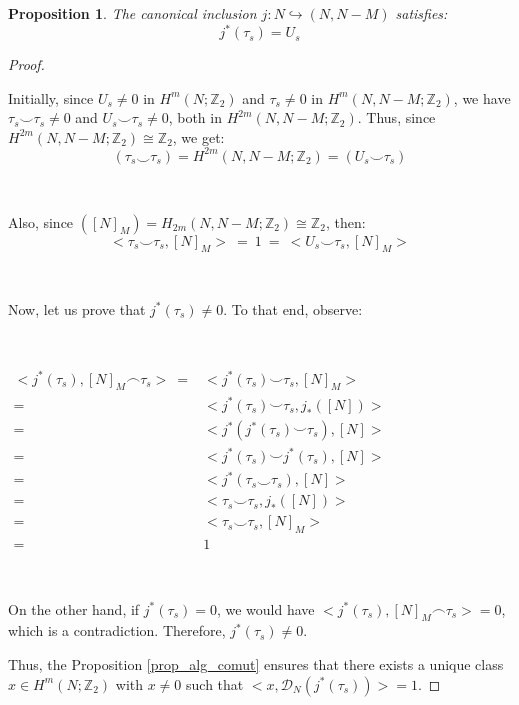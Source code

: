 \documentclass[12pt,oneside]{book}
\newtheorem{prop}   {Proposition}[chapter]
\newcommand{\Z}{\mathbb{Z}}
\newcommand{\ccup}{\smile}
\newcommand{\ccap}{\frown}
\begin{document}
    \begin{prop}\label{principal}
	    The canonical inclusion $j:N\hookrightarrow (N,N-M)$ satisfies:
	    $$ j^{*}(\tau_{s})=U_{s} $$
    \end{prop}
    \begin{proof}

        \

        Initially, since $U_{s}\neq 0$ in $H^{m}(N;\Z_{2})$ and $\tau_{s}\neq 0$ in $H^{m}(N,N-M;\Z_{2})$, we have 
        $\tau_{s}\ccup\tau_{s}\neq 0$ and $U_{s}\ccup\tau_{s}\neq 0$, both in $H^{2m}(N,N-M;\Z_{2})$. Thus, since 
        $H^{2m}(N,N-M;\Z_{2})\cong\Z_{2}$, we get:
        $$ (\tau_{s}\ccup\tau_{s})=H^{2m}(N,N-M;\Z_{2})=(U_{s}\ccup\tau_{s}) $$

        \

        Also, since $([N]_{M})=H_{2m}(N,N-M;\Z_{2})\cong\Z_{2}$, then:
        $$ <\tau_{s}\ccup\tau_{s},[N]_{M}> \ = \ 1 \ = \ <U_{s}\ccup\tau_{s},[N]_{M}> $$

        \

        Now, let us prove that $j^{*}(\tau_{s})\neq 0$. To that end, observe:

        \

        $\begin{array}{rl}
        	<j^{*}(\tau_{s}),[N]_{M}\ccap \tau_{s}> \ = & <j^{*}(\tau_{s})\ccup\tau_{s},[N]_{M}> \\
        	= & <j^{*}(\tau_{s})\ccup\tau_{s},j_{*}([N])> \\
        	= & <j^{*}(j^{*}(\tau_{s})\ccup\tau_{s}),[N]> \\
        	= & <j^{*}(\tau_{s})\ccup j^{*}(\tau_{s}),[N]> \\
        	= & <j^{*}(\tau_{s}\ccup\tau_{s}),[N]> \\
        	= & <\tau_{s}\ccup\tau_{s},j_{*}([N])> \\
        	= & <\tau_{s}\ccup\tau_{s},[N]_{M}> \\
        	= & 1
        \end{array}$

        \

        On the other hand, if $j^{*}(\tau_{s})=0$, we would have $<j^{*}(\tau_{s}),[N]_{M}\ccap \tau_{s}>=0$, which is a contradiction. 
        Therefore, $j^{*}(\tau_{s})\neq 0$.

        Thus, the Proposition \ref{prop_alg_comut} ensures that there exists a unique class $x\in H^{m}(N;\Z_{2})$ with 
        $x\neq 0$ such that $<x,\mathcal{D}_{N}(j^{*}(\tau_{s}))>=1$.


\end{proof}
\end{document}
